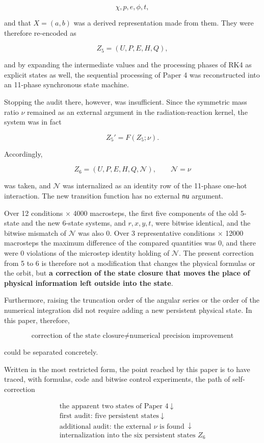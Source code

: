 \documentclass[
  a4paper,
]{article}
\begin{document}
\[
\chi,p,e,\phi,t,
\]

and that \(X=(a,b)\) was a derived representation made from them. They
were therefore re-encoded as

\[
Z_5=(U,P,E,H,Q),
\]

and by expanding the intermediate values and the processing phases of
RK4 as explicit states as well, the sequential processing of Paper 4 was
reconstructed into an 11-phase synchronous state machine.

Stopping the audit there, however, was insufficient. Since the symmetric
mass ratio \(\nu\) remained as an external argument in the
radiation-reaction kernel, the system was in fact

\[
Z_5'=F(Z_5;\nu).
\]

Accordingly,

\[
\boxed{
Z_6=(U,P,E,H,Q,\mathcal N),
\qquad
\mathcal N=\nu
}
\]

was taken, and \(\mathcal N\) was internalized as an identity row of the
11-phase one-hot interaction. The new transition function has no
external \texttt{nu} argument.

Over 12 conditions \(\times\) 4000 macrosteps, the first five components
of the old 5-state and the new 6-state systems, and \(r,x,y,t\), were
bitwise identical, and the bitwise mismatch of \(\mathcal N\) was also
0. Over 3 representative conditions \(\times\) 12000 macrosteps the
maximum difference of the compared quantities was 0, and there were 0
violations of the microstep identity holding of \(\mathcal N\). The
present correction from 5 to 6 is therefore not a modification that
changes the physical formulas or the orbit, but \textbf{a correction of
the state closure that moves the place of physical information left
outside into the state}.

Furthermore, raising the truncation order of the angular series or the
order of the numerical integration did not require adding a new
persistent physical state. In this paper, therefore,

\[
\boxed{
\text{correction of the state closure}
\neq
\text{numerical precision improvement}
}
\]

could be separated concretely.

Written in the most restricted form, the point reached by this paper is
to have traced, with formulas, code and bitwise control experiments, the
path of self-correction

\[
\boxed{
\begin{array}{c}
\text{the apparent two states of Paper 4}\
\downarrow\\
\text{first audit: five persistent states}\
\downarrow\\
\text{additional audit: the external }\nu\text{ is found}\
\downarrow\\
\text{internalization into the six persistent states }Z_6
\end{array}
}
\]
\end{document}
